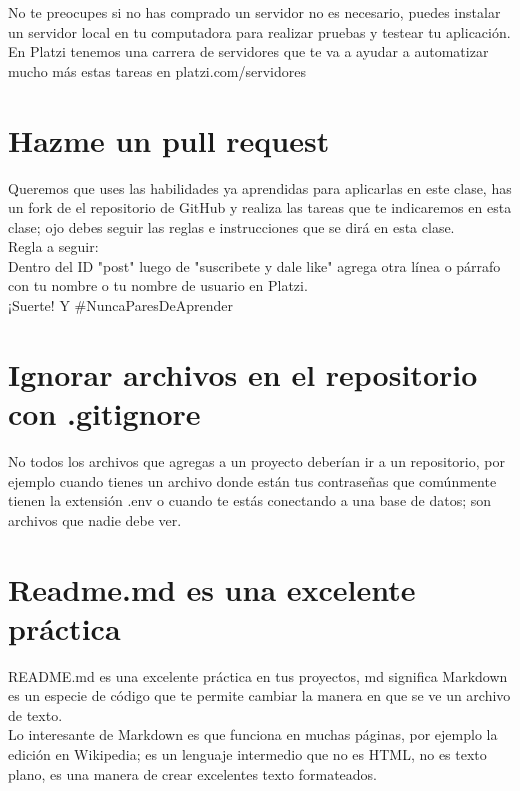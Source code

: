 \documentclass{article}
\begin{document}
No te preocupes si no has comprado un servidor no es necesario, puedes instalar
un servidor local en tu computadora para realizar pruebas y testear tu
aplicación.\\

En Platzi tenemos una carrera de servidores que te va a ayudar a automatizar
mucho más estas tareas en platzi.com/servidores\\

\section{Hazme un pull request}%
Queremos que uses las habilidades ya aprendidas para aplicarlas en este clase,
has un fork de el repositorio de GitHub y realiza las tareas que te indicaremos
en esta clase; ojo debes seguir las reglas e instrucciones que se dirá en esta
clase.\\

Regla a seguir:\\

Dentro del ID "post" luego de "suscribete y dale like" agrega otra línea o
párrafo con tu nombre o tu nombre de usuario en Platzi.\\

¡Suerte! Y \#NuncaParesDeAprender

\section{Ignorar archivos en el repositorio con .gitignore}%
No todos los archivos que agregas a un proyecto deberían ir a un repositorio,
por ejemplo cuando tienes un archivo donde están tus contraseñas que comúnmente
tienen la extensión .env o cuando te estás conectando a una base de datos; son
archivos que nadie debe ver.\\


\section{Readme.md es una excelente práctica}%
README.md es una excelente práctica en tus proyectos, md significa Markdown es
un especie de código que te permite cambiar la manera en que se ve un archivo
de texto.\\

Lo interesante de Markdown es que funciona en muchas páginas, por ejemplo la
edición en Wikipedia; es un lenguaje intermedio que no es HTML, no es texto
plano, es una manera de crear excelentes texto formateados.
\end{document}
